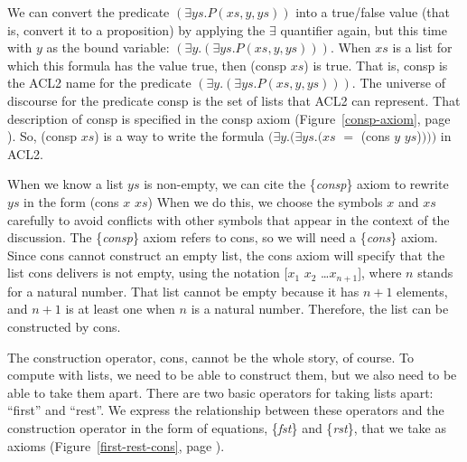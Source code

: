 We can convert the predicate $(\exists ys.P(xs, y, ys))$
into a true/false value (that is, convert it to a proposition)
by applying the $\exists$ quantifier again,
but this time with $y$ as the bound variable:
$(\exists y.(\exists ys.P(xs, y, ys)))$.
When $xs$ is a list for which this formula has the value true,
then (consp $xs$) is true.
That is, consp is the ACL2 name for the predicate $(\exists y.(\exists ys.P(xs, y, ys)))$.
The universe of discourse for the predicate consp is the set of lists that ACL2 can represent.
That description of consp is specified in the consp axiom
(Figure~\ref{consp-axiom}, page \pageref{consp-axiom}).
So, (consp $xs$) is a way to write the formula
$(\exists y.(\exists ys.(xs$ $=$ (cons $y$ $ys$)$)))$ in ACL2.

When we know a list $ys$ is non-empty,
we can cite the \{\emph{consp}\} axiom
to rewrite $ys$ in the form (cons $x$ $xs$)
When we do this, we choose the symbols $x$ and $xs$ carefully
to avoid conflicts with other symbols that appear in the context of the discussion.
The \{\emph{consp}\} axiom refers to cons, so we will need a \{\emph{cons}\} axiom.
Since cons cannot construct an empty list,
the cons axiom will specify that the list cons delivers is not empty,
using the notation [$x_1$ $x_2$ \dots $x_{n+1}$],
where $n$ stands for a natural number.
That list cannot be empty because it has $n+1$ elements, and $n+1$
is at least one when $n$ is a natural number.
Therefore, the list can be constructed by cons.

The construction operator, cons, cannot be the whole story, of course.
To compute with lists, we  need to be able to construct them,
but we also need to be able to take them apart.
There are two basic operators for taking lists apart: ``first'' and ``rest''.
We express the relationship between these operators and
the construction operator in the form of equations,
\{\emph{fst}\} and \{\emph{rst}\}, that we take as axioms
(Figure~\ref{first-rest-cons}, page \pageref{first-rest-cons}).

